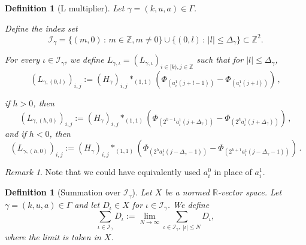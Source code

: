 \documentclass[12pt,reqno]{amsart}
\theoremstyle{plain}
\newtheorem{definition}[theorem]{Definition}
\numberwithin{equation}{section}
\theoremstyle{remark}
\newtheorem{rem}{Remark}[section]
\newcommand{\uses}[1]{}
\newcommand{\usesdefs}[1]{}
\newcommand{\Z}{{\mathbb Z}}
\newcommand{\R}{{\mathbb R}}
\begin{document}
\begin{definition}[L multiplier]\label{L multiplier}\uses{}\usesdefs{auto:convolution-along-vector-definition,standard bump,geometric parameters,H multiplier}
Let $\gamma=(k,u,a)\in \Gamma$.

Define the index set
\begin{equation}\label{auto:L-kernel-index-set}\mathcal{I}_{\gamma} = \{(m,0)\,:\,m\in\mathbb{Z}, m\not=0\} \cup \{(0,l)\,:\,|l|\le \Delta_{\gamma}\} \subset \mathbb{Z}^2.\end{equation}

For every $\iota \in\mathcal{I}_{\gamma}$, we define  $L_{\gamma,\iota}=(L_{\gamma,\iota})_{i\in [k),j\in \Z}$
such that for $|l|\le \Delta_{\gamma}$,
\begin{equation}\label{auto:L-kernel-central-band}
  (L_{\gamma,(0,l)})_{i,j}:= (H_{\gamma})_{i,j} \ast_{(1,1)} (\Phi_{(a_i^1(j+l-1))}-\Phi_{(a_i^1(j+l))})\, ,
 \end{equation}

if $h>0$, then
\begin{equation}\label{auto:L-kernel-positive-band}
(L_{\gamma,(h,0)})_{i,j}:= (H_{\gamma})_{i,j} \ast_{(1,1)} (\Phi_{(2^{h-1}a_i^1(j+\Delta_{\gamma}))}-\Phi_{(2^{h}a_i^1(j+\Delta_{\gamma}))})\, ,
\end{equation}
and if $h<0$, then
\begin{equation}\label{auto:L-kernel-negative-band}
 (L_{\gamma,(h,0)})_{i,j}:= (H_{\gamma})_{i,j} \ast_{(1,1)} (\Phi_{(2^{h}a_i^1(j-\Delta_{\gamma}-1))}-\Phi_{(2^{h+1}a_i^1(j-\Delta_{\gamma}-1))})\, .
\end{equation}
\end{definition}

\begin{rem}
Note that we could have equivalently used $a_{i}^0$ in place of $a_i^1$.
\end{rem}


\begin{definition}[Summation over $\mathcal I_{\gamma}$]\label{summation-definition}\uses{}\usesdefs{geometric parameters,L multiplier}
Let $X$ be a normed $\R$-vector space.
Let $\gamma=(k,u,a)\in \Gamma$ and let $D_\iota \in X$ for $\iota \in \mathcal{I}_{\gamma}$. We define
\begin{equation}\label{auto:symmetric-series-definition}
\sum_{\iota \in \mathcal{I}_{\gamma}} D_{\iota}:=\lim_{N\to \infty} \sum_{\iota \in\mathcal{I}_{\gamma}, ~|\iota| \leq N} D_{\iota},
\end{equation}
where the limit is taken in $X$.
\end{definition}
\end{document}
